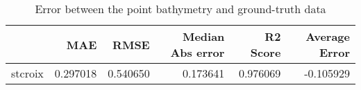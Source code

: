 \begin{table}[h!]
\caption{Error between the point bathymetry and ground-truth data}
\label{tab:stcroix_lidar_error}
\begin{tabular}{lrrrrr}
\toprule
 & MAE & RMSE & Median Abs error & R2 Score & Average Error \\
\midrule
stcroix & 0.297018 & 0.540650 & 0.173641 & 0.976069 & -0.105929 \\
\bottomrule
\end{tabular}
\end{table}
